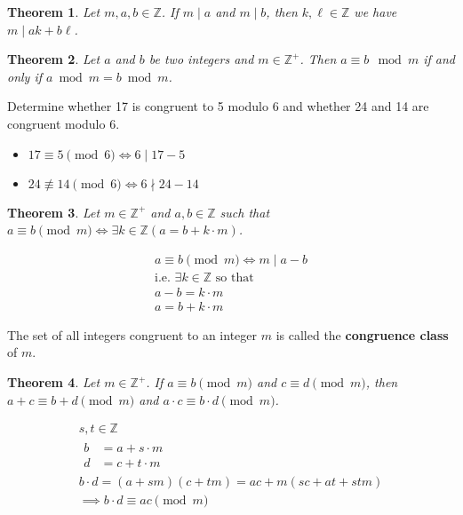 \documentclass[letterpaper, 12pt]{article}
\newtheorem{theorem}{Theorem}[section]
\newenvironment{proof}[1][Proof]{\begin{trivlist}
\item[\hskip \labelsep {\bfseries #1}]}{\end{trivlist}}
\newenvironment{definition}[1][Definition]{\begin{trivlist}
\item[\hskip \labelsep {\bfseries #1}]}{\end{trivlist}}
\newenvironment{example}[1][Example]{\begin{trivlist}
\item[\hskip \labelsep {\bfseries #1}]}{\end{trivlist}}
\newcommand{\keyword}[1]{\textbf{#1}}
\newcommand{\Z}{\mathbb{Z}}
\newcommand{\0}{\emptyset}
\begin{document}
    \begin{theorem}
        Let $m, a, b \in \Z$. If $m \mid a$ and $m \mid b$, then $k, \ell \in \Z$ we have 
        $m \mid ak + b\ell$.
    \end{theorem}
    \begin{theorem}
        Let $a$ and $b$ be two integers and $m \in \Z^+$. Then $a \equiv b \mod m$ if and only if 
        $a \bmod m = b \bmod m$.
    \end{theorem}
    \begin{example}
        Determine whether 17 is congruent to 5 modulo 6 and whether 24 and 14 are congruent 
        modulo 6.
        \begin{itemize}
            \item $17 \equiv 5 \pmod 6 \iff 6 \mid 17 - 5$
            \item $24 \not\equiv 14 \pmod 6 \iff 6 \nmid 24 - 14$
        \end{itemize}
    \end{example}
    \begin{theorem}
        Let $m \in \Z^+$ and $a, b \in \Z$ such that $a \equiv b \pmod m 
        \iff \exists k \in \Z (a = b + k \cdot m)$.
    \end{theorem}
    \begin{proof}
        \begin{gather*}
            a \equiv b \pmod m \iff m \mid a - b \\
            \text{i.e. $\exists k \in \Z$ so that} \\
            a - b = k \cdot m \\
            a = b + k \cdot m
        \end{gather*}
    \end{proof}
    \begin{definition}
        The set of all integers congruent to an integer $m$ is called the 
        \keyword{congruence class} of $m$.
    \end{definition}
    \begin{theorem}
        Let $m \in \Z^+$. If $ a \equiv b \pmod m$ and $c \equiv d \pmod m$, 
        then $a + c \equiv b + d \pmod m$ and $a \cdot c \equiv b \cdot d \pmod m$.
    \end{theorem}
    \begin{proof}
        \begin{gather*}
            s, t \in \Z \\
            \begin{aligned}
                b &= a + s \cdot m \\
                d &= c + t \cdot m
            \end{aligned} \\
            b \cdot d = (a + sm)(c + tm) = ac + m(sc + at + stm) \\
            \implies b \cdot d \equiv ac \pmod m
        \end{gather*}
    \end{proof}
\end{document}
